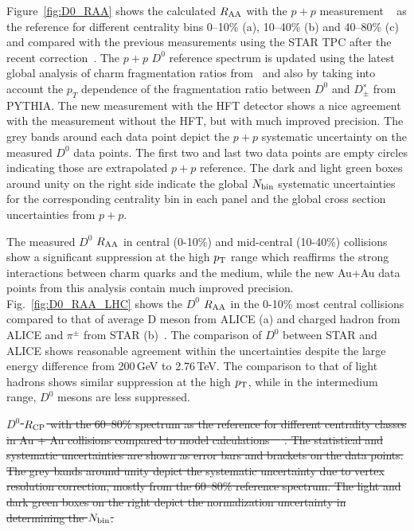 \documentclass[%
 reprint,	
 amsmath,amssymb,
 aps,
 prc,
]{revtex4-1}
\providecommand{\DIFdeltex}[1]{{\protect\color{red}\sout{#1}}}                      %
\providecommand{\DIFdelbegin}{} %
\providecommand{\DIFdelFL}[1]{\DIFdel{#1}} %
\providecommand{\DIFdel}[1]{\texorpdfstring{\DIFdeltex{#1}}{}} %
\begin{document}
Figure~\ref{fig:D0_RAA} shows the calculated $R_{\rm AA}$ with the $p+p$ measurement ~\cite{Star_D_pp} as the reference for different centrality bins 0--10\% (a), 10--40\% (b) and 40--80\% (c) and compared with the previous measurements using the STAR TPC after the recent correction~\cite{Star_D_RAA_corr}. The $p+p$ $D^0$ reference spectrum is updated using the latest global analysis of charm fragmentation ratios from~\cite{charm_frag} and also by taking into account the $p_T$ dependence of the fragmentation ratio between $D^0$ and $D^∗_\pm$ from PYTHIA. The new measurement with the HFT detector shows a nice agreement with the measurement without the HFT, but with much improved precision. The grey bands around each data point depict the $p+p$ systematic uncertainty on the measured $D^0$ data points. The first two and last two data points are empty circles indicating those are extrapolated $p+p$ reference. The dark and light green boxes around unity on the right side indicate the global $N_{\rm bin}$ systematic uncertainties for the corresponding centrality bin in each panel and the global cross section uncertainties from $p+p$.

The measured $D^0$ $R_{\rm AA}$ in central (0-10\%) and mid-central (10-40\%) collisions show a significant suppression at the high $p_{\rm T}$ range which reaffirms the strong interactions between charm quarks and the medium, while the new Au+Au data points from this analysis contain much improved precision. Fig.~\ref{fig:D0_RAA_LHC} shows the $D^0$ $R_{\rm AA}$ in the 0-10\% most central collisions compared to that of average D meson from ALICE (a) and charged hadron from ALICE and $\pi^{\pm}$ from STAR (b)~\cite{Alice_D_RAA_2,Alice_hadron_RAA,PhenixPi0}. The comparison of $D^0$ between STAR and ALICE shows reasonable agreement within the uncertainties despite the large energy difference from 200\,GeV to 2.76\,TeV. The comparison to that of light hadrons shows similar suppression at the high $p_{\rm T}$, while in the intermedium range, $D^0$ mesons are less suppressed.



\DIFdelbegin %
{%
\DIFdelFL{$D^{0}$ $R_{\rm CP}$ with the 60--80\% spectrum as the reference for different centrality classes in Au + Au collisions compared to model calculations~\mbox{%
\cite{Cao:2016gvr,LBT:private}}%
. The statistical and systematic uncertainties are shown as error bars and brackets on the data points. The grey bands around unity depict the systematic uncertainty due to vertex resolution correction, mostly from the 60--80\% reference spectrum. The light and dark green boxes on the right depict the normalization uncertainty in determining the $N_{\rm bin}$.}}
\end{document}
